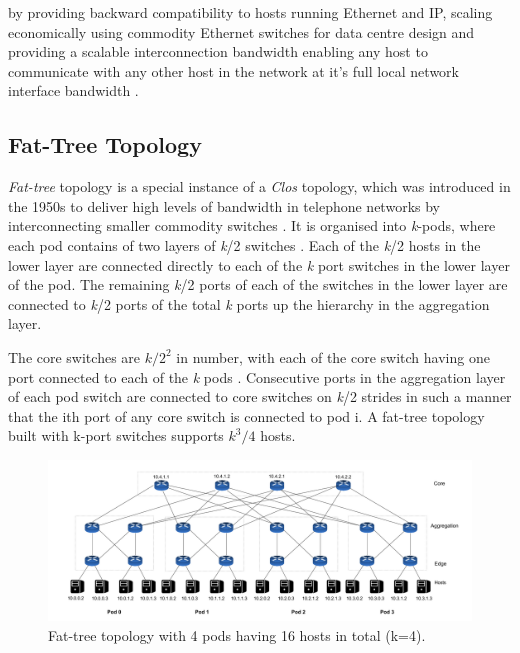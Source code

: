 by providing backward compatibility to hosts running Ethernet and IP, scaling economically using commodity Ethernet switches for data centre design and providing a scalable interconnection bandwidth enabling any host to communicate with any other host in the network at it’s full local network interface bandwidth \cite{al2008scalable}.

\subsection{Fat-Tree Topology} \label{subsec:Fat-Tree Topology}

\textit{Fat-tree} topology \cite{leiserson1985fat} is a special instance of a \textit{Clos} topology, which was introduced in the 1950s to deliver high levels of bandwidth in telephone networks by interconnecting smaller commodity switches \cite{clos1953study}.  It is organised into \textit{k}-pods, where each pod contains of two layers of \textit{k}/2 switches \cite{al2008scalable}. Each of the \textit{k}/2 hosts in the lower layer are connected directly to each of the \textit{k} port switches in the lower layer of the pod. The remaining \textit{k}/2 ports of each of the switches in the lower layer are connected to \textit{k}/2 ports of the total \textit{k} ports up the hierarchy in the aggregation layer.

The core switches are $\textit{k}/2^2$ in number, with each of the core switch having one port connected to each of the \textit{k} pods . Consecutive ports in the aggregation layer of each pod switch are connected to core switches on \textit{k}/2 strides in such a manner that the ith port of any core switch is connected to pod i. A fat-tree topology built with k-port switches supports $\textit{k}^3/4$ hosts.


\begin{figure}[!ht] 
\centerline{\includegraphics[scale=0.30]{FatTreeTopology.png}}
\caption{Fat-tree topology with 4 pods having 16 hosts in total (k=4).}
\label{fig:FatTreeOverview}
\end{figure}

